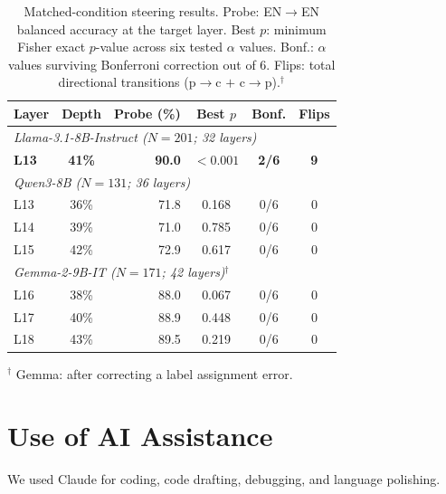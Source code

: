 \documentclass[11pt]{article}
\begin{document}
\begin{table}[!t]
\centering
\caption{Matched-condition steering results. Probe: EN$\to$EN balanced accuracy at the target layer. Best $p$: minimum Fisher exact $p$-value across six tested $\alpha$ values. Bonf.: $\alpha$ values surviving Bonferroni correction out of 6. Flips: total directional transitions (p$\to$c $+$ c$\to$p).$^{\dagger}$}
\label{tab:steering_config}
\small
\begin{tabular}{lcrccc}
\toprule
Layer & Depth & Probe (\%) & Best $p$ & Bonf. & Flips \\
\midrule
\multicolumn{6}{l}{\textit{Llama-3.1-8B-Instruct ($N = 201$; 32 layers)}} \\
\textbf{L13} & \textbf{41\%} & \textbf{90.0} & $\mathbf{<0.001}$ & \textbf{2/6} & \textbf{9} \\
\midrule
\multicolumn{6}{l}{\textit{Qwen3-8B ($N = 131$; 36 layers)}} \\
L13 & 36\% & 71.8 & 0.168 & 0/6 & 0 \\
L14 & 39\% & 71.0 & 0.785 & 0/6 & 0 \\
L15 & 42\% & 72.9 & 0.617 & 0/6 & 0 \\
\midrule
\multicolumn{6}{l}{\textit{Gemma-2-9B-IT ($N = 171$; 42 layers)$^{\dagger}$}} \\
L16 & 38\% & 88.0 & 0.067 & 0/6 & 0 \\
L17 & 40\% & 88.9 & 0.448 & 0/6 & 0 \\
L18 & 43\% & 89.5 & 0.219 & 0/6 & 0 \\
\bottomrule
\end{tabular}
\begin{flushleft}
\footnotesize $^{\dagger}$ Gemma: after correcting a label assignment error.
\end{flushleft}
\end{table}

\section{Use of AI Assistance}
\label{app:ai-assistants}
We used Claude for coding, code drafting, debugging, and language polishing.
\end{document}
